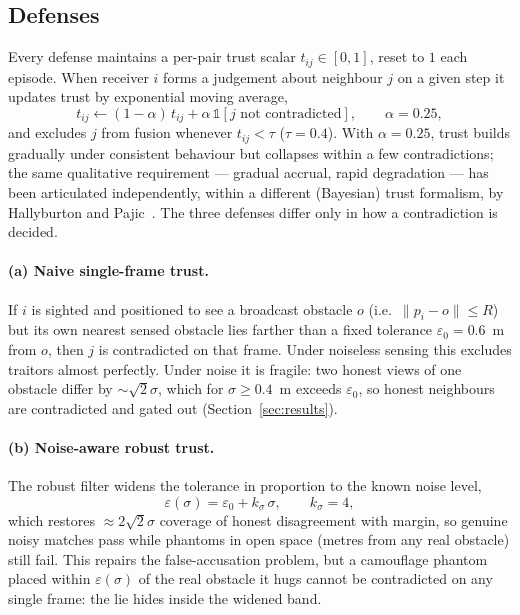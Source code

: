 \subsection{Defenses}\label{sec:methods-defense}
Every defense maintains a per-pair trust scalar $t_{ij}\in[0,1]$, reset to
$1$ each episode. When receiver $i$ forms a judgement about neighbour $j$ on
a given step it updates trust by exponential moving average,
\begin{equation}
t_{ij}\leftarrow(1-\alpha)\,t_{ij}+\alpha\,\mathbb{1}[\text{$j$ not
contradicted}],\qquad \alpha=0.25,
\label{eq:ewma}
\end{equation}
and excludes $j$ from fusion whenever $t_{ij}<\tau$ ($\tau=0.4$). With
$\alpha=0.25$, trust builds gradually under consistent behaviour but
collapses within a few contradictions; the same qualitative requirement ---
gradual accrual, rapid degradation --- has been articulated independently,
within a different (Bayesian) trust formalism, by Hallyburton and
Pajic~\cite{aerialtrust2025}. The three
defenses differ only in how a contradiction is decided.

\paragraph{(a) Naive single-frame trust.}
If $i$ is sighted and positioned to see a broadcast obstacle $o$ (i.e.\
$\lVert p_i-o\rVert\le R$) but its own nearest sensed obstacle lies farther
than a fixed tolerance $\varepsilon_0=0.6$~m from $o$, then $j$ is
contradicted on that frame. Under noiseless sensing this excludes traitors
almost perfectly. Under noise it is fragile: two honest views of one
obstacle differ by $\sim\sqrt{2}\sigma$, which for $\sigma\ge0.4$~m exceeds
$\varepsilon_0$, so honest neighbours are contradicted and gated out
(Section~\ref{sec:results}).

\paragraph{(b) Noise-aware robust trust.}
The robust filter widens the tolerance in proportion to the known noise
level,
\begin{equation}
\varepsilon(\sigma)=\varepsilon_0+k_\sigma\,\sigma,\qquad k_\sigma=4,
\label{eq:robusteps}
\end{equation}
which restores $\approx2\sqrt{2}\sigma$ coverage of honest disagreement with
margin, so genuine noisy matches pass while phantoms in open space (metres
from any real obstacle) still fail. This repairs the false-accusation
problem, but a camouflage phantom placed within $\varepsilon(\sigma)$ of the
real obstacle it hugs cannot be contradicted on any single frame: the lie
hides inside the widened band.

